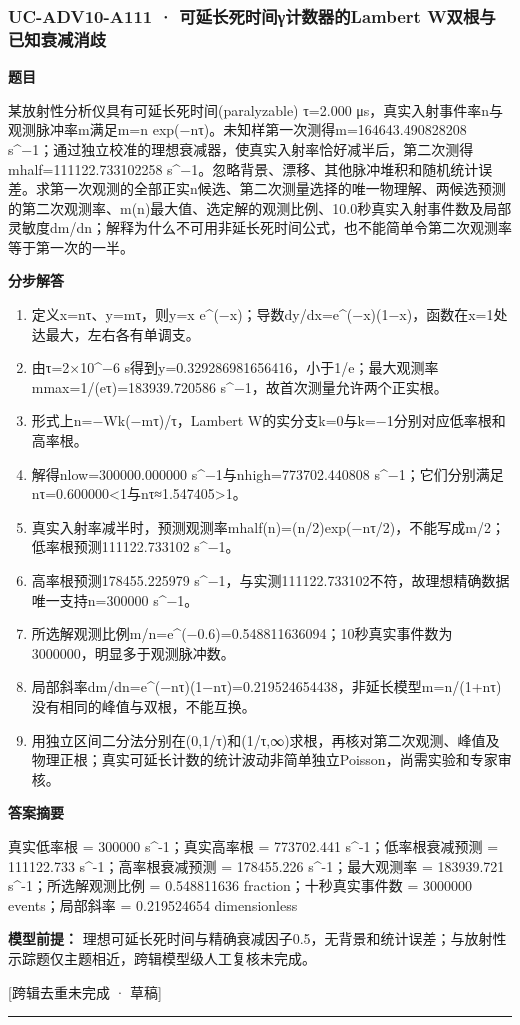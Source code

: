 \documentclass[UTF8,11pt,a4paper]{ctexart}
\begin{document}
\subsubsection*{UC-ADV10-A111 · 可延长死时间γ计数器的Lambert W双根与已知衰减消歧}
\noindent\textbf{题目}\par
某放射性分析仪具有可延长死时间(paralyzable) τ=2.000 μs，真实入射事件率n与观测脉冲率m满足m=n exp(−nτ)。未知样第一次测得m=164643.490828208 s\textasciicircum{}−1；通过独立校准的理想衰减器，使真实入射率恰好减半后，第二次测得mhalf=111122.733102258 s\textasciicircum{}−1。忽略背景、漂移、其他脉冲堆积和随机统计误差。求第一次观测的全部正实n候选、第二次测量选择的唯一物理解、两候选预测的第二次观测率、m(n)最大值、选定解的观测比例、10.0秒真实入射事件数及局部灵敏度dm/dn；解释为什么不可用非延长死时间公式，也不能简单令第二次观测率等于第一次的一半。\par
\medskip\noindent\textbf{分步解答}
\begin{enumerate}
\item 定义x=nτ、y=mτ，则y=x e\textasciicircum{}(−x)；导数dy/dx=e\textasciicircum{}(−x)(1−x)，函数在x=1处达最大，左右各有单调支。
\item 由τ=2×10\textasciicircum{}−6 s得到y=0.329286981656416，小于1/e；最大观测率mmax=1/(eτ)=183939.720586 s\textasciicircum{}−1，故首次测量允许两个正实根。
\item 形式上n=−Wk(−mτ)/τ，Lambert W的实分支k=0与k=−1分别对应低率根和高率根。
\item 解得nlow=300000.000000 s\textasciicircum{}−1与nhigh=773702.440808 s\textasciicircum{}−1；它们分别满足nτ=0.600000<1与nτ≈1.547405>1。
\item 真实入射率减半时，预测观测率mhalf(n)=(n/2)exp(−nτ/2)，不能写成m/2；低率根预测111122.733102 s\textasciicircum{}−1。
\item 高率根预测178455.225979 s\textasciicircum{}−1，与实测111122.733102不符，故理想精确数据唯一支持n=300000 s\textasciicircum{}−1。
\item 所选解观测比例m/n=e\textasciicircum{}(−0.6)=0.548811636094；10秒真实事件数为3000000，明显多于观测脉冲数。
\item 局部斜率dm/dn=e\textasciicircum{}(−nτ)(1−nτ)=0.219524654438，非延长模型m=n/(1+nτ)没有相同的峰值与双根，不能互换。
\item 用独立区间二分法分别在(0,1/τ)和(1/τ,∞)求根，再核对第二次观测、峰值及物理正根；真实可延长计数的统计波动非简单独立Poisson，尚需实验和专家审核。
\end{enumerate}
\noindent\textbf{答案摘要}\par
真实低率根 = 300000 s\textasciicircum{}-1；真实高率根 = 773702.441 s\textasciicircum{}-1；低率根衰减预测 = 111122.733 s\textasciicircum{}-1；高率根衰减预测 = 178455.226 s\textasciicircum{}-1；最大观测率 = 183939.721 s\textasciicircum{}-1；所选解观测比例 = 0.548811636 fraction；十秒真实事件数 = 3000000 events；局部斜率 = 0.219524654 dimensionless\par
\noindent\textbf{模型前提：}
理想可延长死时间与精确衰减因子0.5，无背景和统计误差；与放射性示踪题仅主题相近，跨辑模型级人工复核未完成。\par
\noindent\textcolor{red!65!black}{[跨辑去重未完成 · 草稿]} \par
\medskip\hrule\medskip
{}
\end{document}
